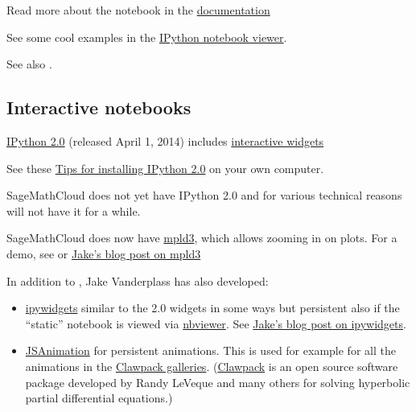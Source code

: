 \documentclass[letterpaper,10pt,english]{sphinxmanual}
\begin{document}
Read more about the notebook in the \href{http://ipython.org/ipython-doc/dev/interactive/htmlnotebook.html}{documentation}

See some cool examples in the \href{http://nbviewer.ipython.org/}{IPython notebook viewer}.

See also {\hyperref[sage:sagemath]{}}.


\subsection{Interactive notebooks}
\label{ipython_notebook:interactive-notebooks}
\href{http://ipython.org/ipython-doc/dev/whatsnew/version2.0.html}{IPython 2.0}
(released April 1, 2014) includes \href{http://nbviewer.ipython.org/github/ipython/ipython/blob/2.x/examples/Interactive\%20Widgets/Index.ipynb}{interactive widgets}

See these \href{http://ipython.org/install.html}{Tips for installing IPython 2.0}
on your own computer.

SageMathCloud does not yet have IPython 2.0 and for various technical
reasons will not have it for a while.

SageMathCloud does now have \href{https://github.com/jakevdp/mpld3}{mpld3}, which
allows zooming in on plots.  For a demo, see {\hyperref[labs/lab13:lab13]{}} or
\href{http://jakevdp.github.io/blog/2013/12/19/a-d3-viewer-for-matplotlib/}{Jake's blog post on mpld3}

In addition to , Jake Vanderplass has also developed:
\begin{itemize}
\item {} 
\href{https://github.com/jakevdp/ipywidgets}{ipywidgets} similar to the 2.0
widgets in some ways but persistent also if the ``static'' notebook is
viewed via \href{http://nbviewer.ipython.org}{nbviewer}.
See \href{http://jakevdp.github.io/blog/2013/12/05/static-interactive-widgets/}{Jake's blog post on ipywidgets}.

\item {} 
\href{https://github.com/jakevdp/JSAnimation}{JSAnimation} for persistent
animations.  This is used for example for all the animations in the
\href{http://clawpack.github.io/doc/galleries.html}{Clawpack galleries}.
(\href{http://www.clawpack.org}{Clawpack} is an open source software
package developed by Randy LeVeque and many others for solving
hyperbolic partial differential equations.)

\end{itemize}
\end{document}
